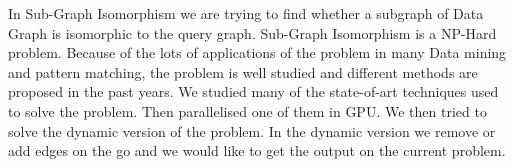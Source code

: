 \abstract


\vspace*{24pt}
In Sub-Graph Isomorphism we are trying to find whether a subgraph of Data Graph is isomorphic to the query graph. Sub-Graph Isomorphism is a NP-Hard problem. Because of the lots of applications of the problem in many Data mining and pattern matching, the problem is well studied and different methods are proposed in the past years. We studied many of the state-of-art techniques used to solve the problem. Then parallelised one of them in GPU. We then tried to solve the dynamic version of the problem. In the dynamic version we remove or add edges on the go and we would like to get the output on the current problem.
\pagebreak